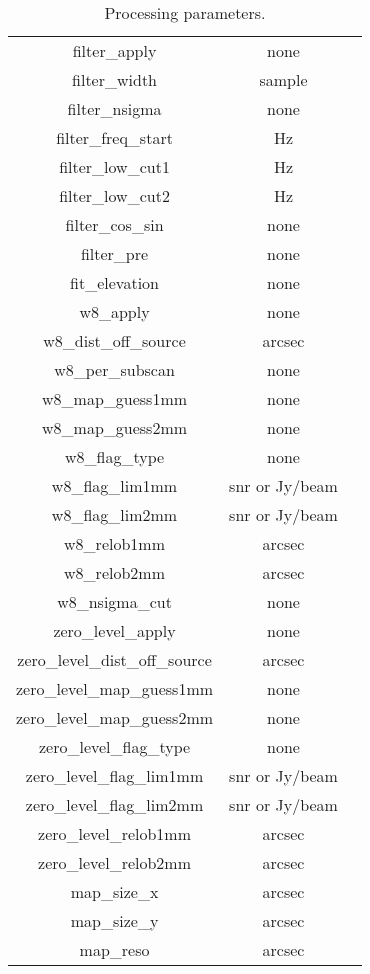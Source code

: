 \documentclass[a4paper,10pt]{article}
\begin{document}
\begin{table}[ht]
\begin{center}
\begin{tabular}{|c|c|c|}
	filter\_apply & none & \\ 
	filter\_width & sample &  \\ 
	filter\_nsigma & none & \\ 
	filter\_freq\_start & Hz &  \\ 
	filter\_low\_cut1 & Hz &  \\ 
	filter\_low\_cut2 & Hz &  \\ 
	filter\_cos\_sin & none &  \\ 
	filter\_pre & none &  \\ 
	fit\_elevation & none &  \\ 
	w8\_apply & none &  \\ 
	w8\_dist\_off\_source & arcsec & \\ 
	w8\_per\_subscan & none & \\ 
	w8\_map\_guess1mm & none & \\ 
	w8\_map\_guess2mm & none & \\ 
	w8\_flag\_type & none &  \\ 
	w8\_flag\_lim1mm & snr or Jy/beam & \\  
	w8\_flag\_lim2mm & snr or Jy/beam &  \\ 
	w8\_relob1mm & arcsec &  \\ 
	w8\_relob2mm & arcsec &  \\ 
	w8\_nsigma\_cut & none &  \\ 
	zero\_level\_apply & none &  \\ 
	zero\_level\_dist\_off\_source & arcsec &  \\ 
	zero\_level\_map\_guess1mm & none &  \\ 
	zero\_level\_map\_guess2mm & none &  \\ 
	zero\_level\_flag\_type & none &  \\ 
	zero\_level\_flag\_lim1mm & snr or Jy/beam &  \\ 
	zero\_level\_flag\_lim2mm & snr or Jy/beam &  \\ 
	zero\_level\_relob1mm & arcsec &  \\ 
	zero\_level\_relob2mm & arcsec &  \\ 
	map\_size\_x & arcsec &  \\ 
	map\_size\_y & arcsec &  \\ 
	map\_reso & arcsec &  \\ 
	\hline
	\end{tabular}
	\end{center}
	\caption{Processing parameters.}
	\label{tab:table_param}
	\end{table}
\end{document}

